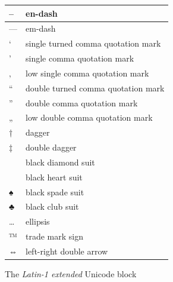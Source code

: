 \documentclass[a4paper]{article}
\newlength{\DUtablewidth} %
\providecommand*{\DUroletitlereference}[1]{\textsl{#1}}
\begin{document}
\setlength{\DUtablewidth}{\linewidth}%
\begin{longtable*}{|p{0.028\DUtablewidth}|p{0.424\DUtablewidth}|}
\hline

–
 & 
en-dash
 \\
\hline

—
 & 
em-dash
 \\
\hline

‘
 & 
single turned comma quotation mark
 \\
\hline

’
 & 
single comma quotation mark
 \\
\hline

‚
 & 
low single comma quotation mark
 \\
\hline

“
 & 
double turned comma quotation mark
 \\
\hline

”
 & 
double comma quotation mark
 \\
\hline

„
 & 
low double comma quotation mark
 \\
\hline

†
 & 
dagger
 \\
\hline

‡
 & 
double dagger
 \\
\hline

 & 
black diamond suit
 \\
\hline

 & 
black heart suit
 \\
\hline

♠
 & 
black spade suit
 \\
\hline

♣
 & 
black club suit
 \\
\hline

…
 & 
ellipsis
 \\
\hline

™
 & 
trade mark sign
 \\
\hline

⇔
 & 
left-right double arrow
 \\
\hline
\end{longtable*}

The \DUroletitlereference{Latin-1 extended} Unicode block
\end{document}
